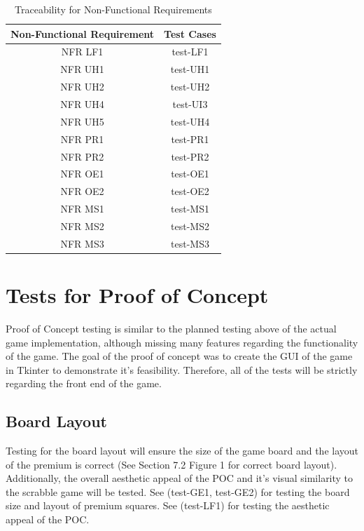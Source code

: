 \documentclass[12pt, titlepage]{article}
\begin{document}
\begin{table}[H]
  \begin{center}
    \caption{Traceability for Non-Functional Requirements}
    \label{tab:table1}
    \begin{tabular}{c|c} 
        \toprule
        \textbf{Non-Functional Requirement} & \textbf{Test Cases}\\
        \midrule
        NFR LF1 & test-LF1 \\
        \hline
        NFR UH1 & test-UH1\\
        \hline
        NFR UH2 & test-UH2\\
        \hline
        NFR UH4 & test-UI3\\
        \hline
        NFR UH5 & test-UH4\\
        \hline
        NFR PR1 & test-PR1\\
        \hline
        NFR PR2 & test-PR2\\
        \hline
        NFR OE1 & test-OE1 \\
        \hline
        NFR OE2 & test-OE2 \\
        \hline
        NFR MS1 & test-MS1\\
        \hline
        NFR MS2 & test-MS2\\
        \hline
        NFR MS3 & test-MS3 \\
        \bottomrule
    \end{tabular}
  \end{center}
\end{table}

\section{Tests for Proof of Concept}%
Proof of Concept testing is similar to the planned testing above of the actual game implementation, although missing many features regarding the functionality of the game. The goal of the proof of concept was to create the GUI of the game in Tkinter to demonstrate it's feasibility. Therefore, all of the tests will be strictly regarding the front end of the game. 

\subsection{Board Layout}

Testing for the board layout will ensure the size of the game board and the layout of the premium is correct (See Section 7.2 Figure 1 for correct board layout). Additionally, the overall aesthetic appeal of the POC and it's visual similarity to the scrabble game will be tested. See (test-GE1, test-GE2) for testing the board size and layout of premium squares. See (test-LF1) for testing the aesthetic appeal of the POC. 
\end{document}

